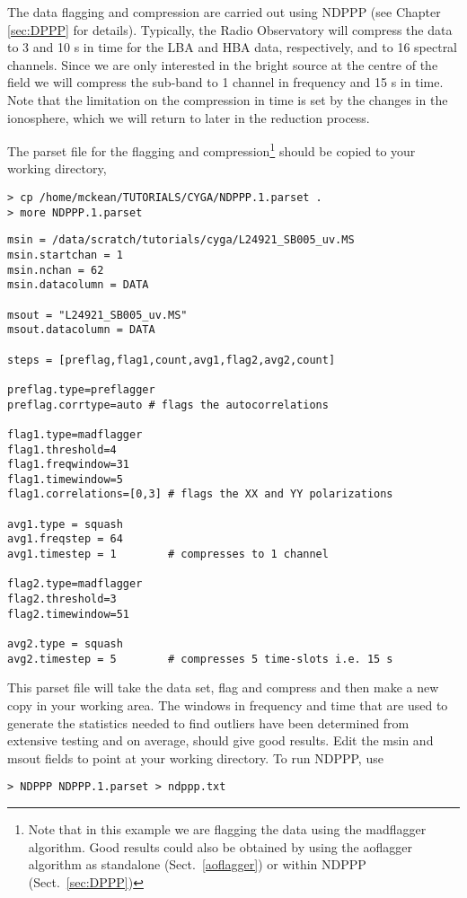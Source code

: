The data flagging and compression are carried out using NDPPP (see Chapter \ref{sec:DPPP} for details). Typically, the Radio Observatory will compress the data to 3 and 10 s in time for the LBA and HBA data, respectively, and to 16 spectral channels. Since we are only interested in the bright source at the centre of the field we will compress the sub-band to 1 channel in frequency and 15 s in time. Note that the limitation on the compression in time is set by the changes in the ionosphere, which we will return to later in the reduction process.

The parset file for the flagging and compression\footnote{Note that in this example we are flagging the data using the madflagger algorithm. Good results could also be obtained by using the aoflagger algorithm as standalone (Sect.~\ref{aoflagger}) or within NDPPP (Sect.~\ref{sec:DPPP})} should be copied to your working directory,

\begin{verbatim}
> cp /home/mckean/TUTORIALS/CYGA/NDPPP.1.parset .
> more NDPPP.1.parset
\end{verbatim}
\begin{lstlisting}
msin = /data/scratch/tutorials/cyga/L24921_SB005_uv.MS
msin.startchan = 1
msin.nchan = 62
msin.datacolumn = DATA

msout = "L24921_SB005_uv.MS"
msout.datacolumn = DATA

steps = [preflag,flag1,count,avg1,flag2,avg2,count]

preflag.type=preflagger
preflag.corrtype=auto # flags the autocorrelations

flag1.type=madflagger
flag1.threshold=4
flag1.freqwindow=31
flag1.timewindow=5
flag1.correlations=[0,3] # flags the XX and YY polarizations

avg1.type = squash
avg1.freqstep = 64
avg1.timestep = 1        # compresses to 1 channel

flag2.type=madflagger
flag2.threshold=3
flag2.timewindow=51

avg2.type = squash
avg2.timestep = 5        # compresses 5 time-slots i.e. 15 s
\end{lstlisting}

This parset file will take the data set, flag and compress and then make a new copy in your working area. The windows in frequency and time that are used to generate the statistics needed to find outliers have been determined from extensive testing and on average, should give good results. Edit the {msin} and {msout} fields to point at your working directory. To run NDPPP, use
\begin{verbatim}
> NDPPP NDPPP.1.parset > ndppp.txt
\end{verbatim}

